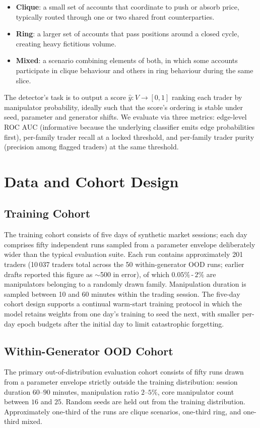 \documentclass[10pt,twocolumn,letterpaper]{article}
\begin{document}
\begin{itemize}
\item \textbf{Clique}: a small set of accounts that coordinate to push
or absorb price, typically routed through one or two shared front
counterparties.
\item \textbf{Ring}: a larger set of accounts that pass positions
around a closed cycle, creating heavy fictitious volume.
\item \textbf{Mixed}: a scenario combining elements of both, in which
some accounts participate in clique behaviour and others in ring
behaviour during the same slice.
\end{itemize}

The detector's task is to output a score
\(\hat{y}\colon V\to[0,1]\) ranking each trader by manipulator
probability, ideally such that the score's ordering is stable under
seed, parameter and generator shifts. We evaluate via three metrics:
edge-level ROC AUC (informative because the underlying classifier
emits edge probabilities first), per-family trader recall at a locked
threshold, and per-family trader purity (precision among flagged
traders) at the same threshold.

\section{Data and Cohort Design}
\label{sec:data}

\subsection{Training Cohort}
The training cohort consists of five days of synthetic market
sessions; each day comprises fifty independent runs sampled from a
parameter envelope deliberately wider than the typical evaluation
suite. Each run contains approximately 201 traders (10\,037 traders total across the 50 within-generator OOD runs; earlier drafts reported this figure as $\sim$500 in error), of which
\(0.05\%\)\,-\,\(2\%\) are manipulators belonging to a randomly drawn
family. Manipulation duration is sampled between 10 and 60 minutes
within the trading session. The five-day cohort design supports a
continual warm-start training protocol in which the model retains
weights from one day's training to seed the next, with smaller per-day
epoch budgets after the initial day to limit catastrophic forgetting.

\subsection{Within-Generator OOD Cohort}
The primary out-of-distribution evaluation cohort consists of fifty
runs drawn from a parameter envelope strictly outside the training
distribution: session duration \(60\)--\(90\) minutes, manipulation
ratio \(2\)--\(5\%\), core manipulator count between \(16\) and
\(25\). Random seeds are held out from the training distribution.
Approximately one-third of the runs are clique scenarios, one-third
ring, and one-third mixed.
\end{document}
